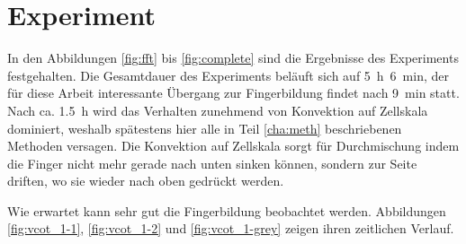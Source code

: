 % 



\section{\COTm Experiment}
\label{res:cot}



In den Abbildungen \ref{fig:fft} bis \ref{fig:complete} sind die Ergebnisse des \COTm Experiments festgehalten. Die Gesamtdauer des Experiments beläuft sich auf \mbox{\SI{5}{\hour} \SI{6}{\minute}}, der für diese Arbeit interessante Übergang zur Fingerbildung findet nach \SI{9}{\minute} statt. Nach ca. \SI{1,5}{\hour} wird das Verhalten zunehmend von Konvektion auf Zellskala dominiert, weshalb spätestens hier alle in Teil \ref{cha:meth} beschriebenen Methoden versagen. 
Die Konvektion auf Zellskala sorgt für Durchmischung indem die Finger nicht mehr gerade nach unten sinken können, sondern zur Seite driften, wo sie wieder nach oben gedrückt werden.

Wie erwartet kann sehr gut die Fingerbildung beobachtet werden. Abbildungen \ref{fig:vcot_1-1}, \ref{fig:vcot_1-2} und \ref{fig:vcot_1-grey} zeigen ihren zeitlichen Verlauf.



